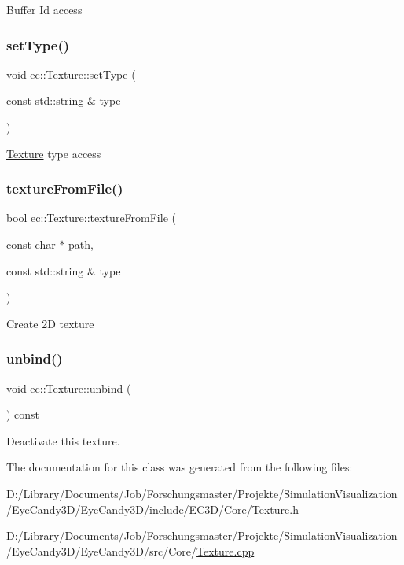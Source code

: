 Buffer Id access \mbox{\label{classec_1_1_texture_a4d984f43478753facd81186d1cd36bcb}} 
\subsubsection{\texorpdfstring{set\+Type()}{setType()}}
{\footnotesize\ttfamily void ec\+::\+Texture\+::set\+Type (\begin{DoxyParamCaption}\item[{const std\+::string \&}]{type }\end{DoxyParamCaption})}

\mbox{\hyperlink{classec_1_1_texture}{Texture}} type access \mbox{\label{classec_1_1_texture_ac2461a696b914d1b22192a87d326f480}} 
\subsubsection{\texorpdfstring{texture\+From\+File()}{textureFromFile()}}
{\footnotesize\ttfamily bool ec\+::\+Texture\+::texture\+From\+File (\begin{DoxyParamCaption}\item[{const char $\ast$}]{path,  }\item[{const std\+::string \&}]{type }\end{DoxyParamCaption})}

Create 2D texture \mbox{\label{classec_1_1_texture_a95c72abc5c801df231fc970c6adffdcc}} 
\subsubsection{\texorpdfstring{unbind()}{unbind()}}
{\footnotesize\ttfamily void ec\+::\+Texture\+::unbind (\begin{DoxyParamCaption}{ }\end{DoxyParamCaption}) const}

Deactivate this texture. 

The documentation for this class was generated from the following files\+:\begin{DoxyCompactItemize}
\item 
D\+:/\+Library/\+Documents/\+Job/\+Forschungsmaster/\+Projekte/\+Simulation\+Visualization/\+Eye\+Candy3\+D/\+Eye\+Candy3\+D/include/\+E\+C3\+D/\+Core/\mbox{\hyperlink{_texture_8h}{Texture.\+h}}\item 
D\+:/\+Library/\+Documents/\+Job/\+Forschungsmaster/\+Projekte/\+Simulation\+Visualization/\+Eye\+Candy3\+D/\+Eye\+Candy3\+D/src/\+Core/\mbox{\hyperlink{_texture_8cpp}{Texture.\+cpp}}\end{DoxyCompactItemize}

